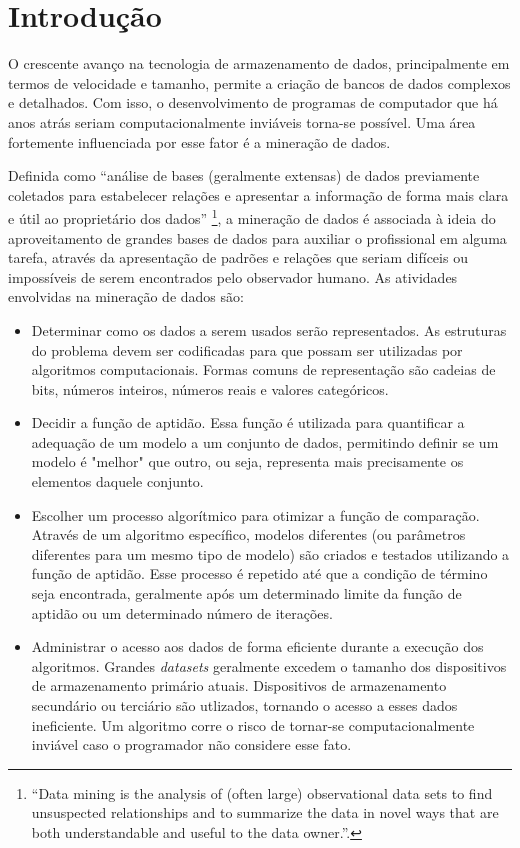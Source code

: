 \chapter{Introdução}

O crescente avanço na tecnologia de armazenamento de dados, principalmente em termos de velocidade e tamanho, permite a criação de bancos de dados complexos e detalhados. Com isso, o desenvolvimento de programas de computador que há anos atrás seriam computacionalmente inviáveis torna-se possível. Uma área fortemente influenciada por esse fator é a mineração de dados.

Definida como ``análise de bases (geralmente extensas) de dados previamente coletados para estabelecer relações e apresentar a informação de forma mais clara e útil ao proprietário dos dados'' \cite[p. 1]{Hand2001}\footnote{``Data mining is the analysis of (often large) observational data sets to find unsuspected relationships and to summarize the data in novel ways that are both understandable and useful to the data owner.''.}, a mineração de dados é associada à ideia do aproveitamento de grandes bases de dados para auxiliar o profissional em alguma tarefa, através da apresentação de padrões e relações que seriam difíceis ou impossíveis de serem encontrados pelo observador humano. As atividades envolvidas na mineração de dados são:

\begin{itemize}
\item Determinar como os dados a serem usados serão representados. As estruturas do problema devem ser codificadas para que possam ser utilizadas por algoritmos computacionais. Formas comuns de representação são cadeias de bits, números inteiros, números reais e valores categóricos.
\item Decidir a função de aptidão. Essa função é utilizada para quantificar a adequação de um modelo a um conjunto de dados, permitindo definir se um modelo é "melhor" que outro, ou seja, representa mais precisamente os elementos daquele conjunto.
\item Escolher um processo algorítmico para otimizar a função de comparação. Através de um algoritmo específico, modelos diferentes (ou parâmetros diferentes para um mesmo tipo de modelo) são criados e testados utilizando a função de aptidão. Esse processo é repetido até que a condição de término seja encontrada, geralmente após um determinado limite da função de aptidão ou um determinado número de iterações.
\item Administrar o acesso aos dados de forma eficiente durante a execução dos algoritmos. Grandes \emph{datasets} geralmente excedem o tamanho dos dispositivos de armazenamento primário atuais. Dispositivos de armazenamento secundário ou terciário são utlizados, tornando o acesso a esses dados ineficiente. Um algoritmo corre o risco de tornar-se computacionalmente inviável caso o programador não considere esse fato.
\end{itemize}

